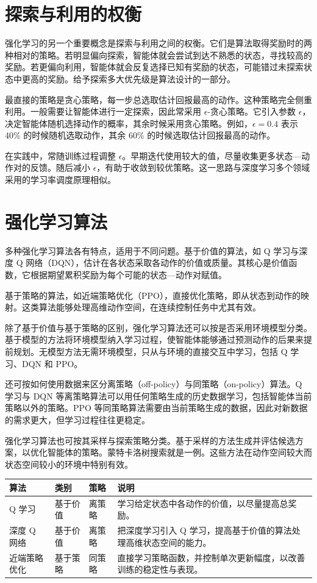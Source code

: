 \section{探索与利用的权衡}
\label{sec:appb-exploration}
强化学习的另一个重要概念是探索与利用之间的权衡。它们是算法取得奖励时的两种相对的策略。若明显偏向探索，智能体就会尝试到达不熟悉的状态，寻找较高的奖励。若更偏向利用，智能体就会反复选择已知有奖励的状态，可能错过未探索状态中更高的奖励。给予探索多大优先级是算法设计的一部分。

最直接的策略是贪心策略，每一步总选取估计回报最高的动作。这种策略完全侧重利用。一般需要让智能体进行一定探索，因此常采用 $\epsilon$-贪心策略。它引入参数 $\epsilon$，决定智能体随机选择动作的概率，其余时候采用贪心策略。例如，$\epsilon=0.4$ 表示 40\% 的时候随机选取动作，其余 60\% 的时候选取估计回报最高的动作。

在实践中，常随训练过程调整 $\epsilon$。早期迭代使用较大的值，尽量收集更多状态—动作对的反馈。随后减小 $\epsilon$，有助于收敛到较优策略。这一思路与深度学习多个领域采用的学习率调度原理相似。

\section{强化学习算法}
多种强化学习算法各有特点，适用于不同问题。基于价值的算法，如 Q 学习与深度 Q 网络（DQN），估计在各状态采取各动作的价值或质量。其核心是价值函数，它根据期望累积奖励为每个可能的状态—动作对赋值。

基于策略的算法，如近端策略优化（PPO），直接优化策略，即从状态到动作的映射。这类算法能够处理高维动作空间，在连续控制任务中尤其有效。

除了基于价值与基于策略的区别，强化学习算法还可以按是否采用环境模型分类。基于模型的方法将环境模型纳入学习过程，使智能体能够通过预测动作的后果来提前规划。无模型方法无需环境模型，只从与环境的直接交互中学习，包括 Q 学习、DQN 和 PPO。

还可按如何使用数据来区分离策略（off-policy）与同策略（on-policy）算法。Q 学习与 DQN 等离策略算法可以用任何策略生成的历史数据学习，包括智能体当前策略以外的策略。PPO 等同策略算法需要由当前策略生成的数据，因此对新数据的需求更大，但学习过程往往更稳定。

强化学习算法也可按其采样与探索策略分类。基于采样的方法生成并评估候选方案，以优化智能体的策略。蒙特卡洛树搜索就是一例。这些方法在动作空间较大而状态空间较小的环境中特别有效。

\begin{center}
\small\setlength{\tabcolsep}{4pt}
\begin{tabularx}{\linewidth}{@{}p{23mm}p{16mm}p{13mm}>{\raggedright\arraybackslash}X@{}}
\toprule
算法 & 类别 & 策略 & 说明\\
\midrule
Q 学习 & 基于价值 & 离策略 & 学习给定状态中各动作的价值，以尽量提高总奖励。\\
深度 Q 网络 & 基于价值 & 离策略 & 把深度学习引入 Q 学习，提高基于价值的算法处理高维状态空间的能力。\\
近端策略优化 & 基于策略 & 同策略 & 直接学习策略函数，并控制单次更新幅度，以改善训练的稳定性与表现。\\
\bottomrule
\end{tabularx}
\end{center}

